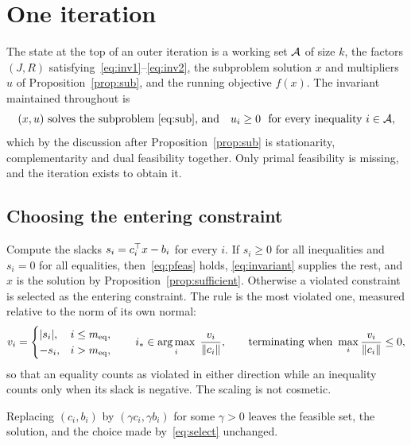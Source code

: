 \section{One iteration}
\label{sec:iteration}

The state at the top of an outer iteration is a working set $\mathcal{A}$ of size
$k$, the factors $(J,R)$ satisfying~\eqref{eq:inv1}--\eqref{eq:inv2}, the
subproblem solution $x$ and multipliers $u$ of Proposition~\ref{prop:sub}, and
the running objective $f(x)$. The invariant maintained throughout is
\begin{equation}
  \text{$(x,u)$ solves the subproblem~\eqref{eq:sub}, and}
  \quad u_i \ge 0 \ \text{ for every inequality } i \in \mathcal{A},
  \label{eq:invariant}
\end{equation}
which by the discussion after Proposition~\ref{prop:sub} is stationarity,
complementarity and dual feasibility together. Only primal feasibility is
missing, and the iteration exists to obtain it.

\subsection{Choosing the entering constraint}

Compute the slacks $s_i = c_i^{\top} x - b_i$ for every $i$. If $s_i \ge 0$ for all
inequalities and $s_i = 0$ for all equalities, then~\eqref{eq:pfeas} holds,
\eqref{eq:invariant} supplies the rest, and $x$ is the solution by
Proposition~\ref{prop:sufficient}. Otherwise a violated constraint is selected as
the entering constraint. The rule is the most violated one, measured relative to
the norm of its own normal:
\begin{equation}
  v_i = \begin{cases} |s_i|, & i \le m_{\mathrm{eq}},\\ -s_i, & i > m_{\mathrm{eq}},\end{cases}
  \qquad
  i_* \in \operatorname*{arg\,max}_i \; \frac{v_i}{\lVert c_i \rVert},
  \qquad\text{terminating when } \max_i \frac{v_i}{\lVert c_i \rVert} \le 0,
  \label{eq:select}
\end{equation}
so that an equality counts as violated in either direction while an inequality
counts only when its slack is negative. The scaling is not cosmetic.

\begin{proposition}\label{prop:scale}
Replacing $(c_i, b_i)$ by $(\gamma c_i, \gamma b_i)$ for some $\gamma > 0$ leaves
the feasible set, the solution, and the choice made by~\eqref{eq:select}
unchanged.
\end{proposition}

